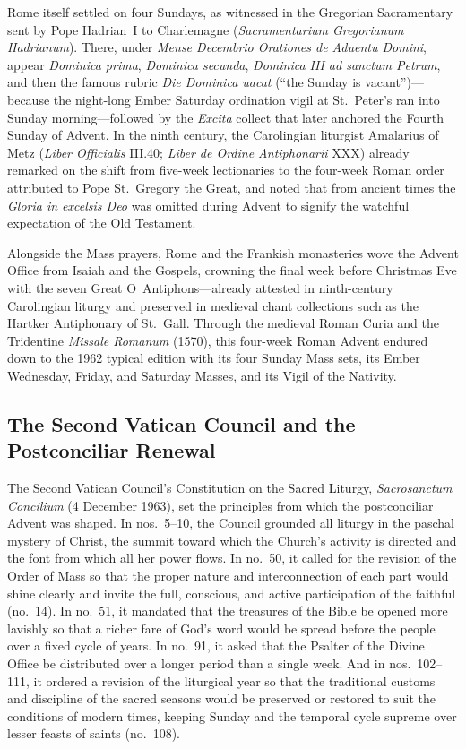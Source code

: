 Rome itself settled on four Sundays, as witnessed in the Gregorian Sacramentary sent by Pope Hadrian~I to Charlemagne (\textit{Sacramentarium Gregorianum Hadrianum}). There, under \textit{Mense Decembrio Orationes de Aduentu Domini}, appear \textit{Dominica prima}, \textit{Dominica secunda}, \textit{Dominica III ad sanctum Petrum}, and then the famous rubric \textit{Die Dominica uacat} (``the Sunday is vacant'')---because the night-long Ember Saturday ordination vigil at St.~Peter's ran into Sunday morning---followed by the \textit{Excita} collect that later anchored the Fourth Sunday of Advent. In the ninth century, the Carolingian liturgist Amalarius of Metz (\textit{Liber Officialis} III.40; \textit{Liber de Ordine Antiphonarii} XXX) already remarked on the shift from five-week lectionaries to the four-week Roman order attributed to Pope St.~Gregory the Great, and noted that from ancient times the \textit{Gloria in excelsis Deo} was omitted during Advent to signify the watchful expectation of the Old Testament.

Alongside the Mass prayers, Rome and the Frankish monasteries wove the Advent Office from Isaiah and the Gospels, crowning the final week before Christmas Eve with the seven Great O~Antiphons---already attested in ninth-century Carolingian liturgy and preserved in medieval chant collections such as the Hartker Antiphonary of St.~Gall. Through the medieval Roman Curia and the Tridentine \textit{Missale Romanum} (1570), this four-week Roman Advent endured down to the 1962 typical edition with its four Sunday Mass sets, its Ember Wednesday, Friday, and Saturday Masses, and its Vigil of the Nativity.

\subsection{The Second Vatican Council and the Postconciliar Renewal}

The Second Vatican Council's Constitution on the Sacred Liturgy, \textit{Sacrosanctum Concilium} (4 December 1963), set the principles from which the postconciliar Advent was shaped. In nos.~5--10, the Council grounded all liturgy in the paschal mystery of Christ, the summit toward which the Church's activity is directed and the font from which all her power flows. In no.~50, it called for the revision of the Order of Mass so that the proper nature and interconnection of each part would shine clearly and invite the full, conscious, and active participation of the faithful (no.~14). In no.~51, it mandated that the treasures of the Bible be opened more lavishly so that a richer fare of God's word would be spread before the people over a fixed cycle of years. In no.~91, it asked that the Psalter of the Divine Office be distributed over a longer period than a single week. And in nos.~102--111, it ordered a revision of the liturgical year so that the traditional customs and discipline of the sacred seasons would be preserved or restored to suit the conditions of modern times, keeping Sunday and the temporal cycle supreme over lesser feasts of saints (no.~108).

